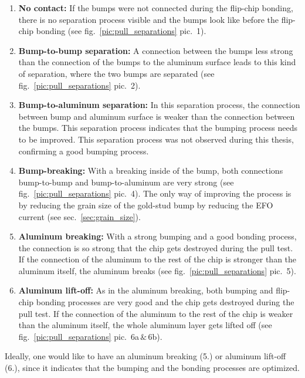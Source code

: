 \begin{enumerate}
\item \textbf{No contact:} If the bumps were not connected during the flip-chip bonding, there is no separation process visible and the bumps look like before the flip-chip bonding (see fig.~\ref{pic:pull_separations} pic.~1).
\item \textbf{Bump-to-bump separation:} A connection between the bumps less strong than the connection of the bumps to the aluminum surface leads to this kind of separation, where the two bumps are separated (see fig.~\ref{pic:pull_separations} pic.~2).
\item \textbf{Bump-to-aluminum separation:} In this separation process, the connection between bump and aluminum surface is weaker than the connection between the bumps. This separation process indicates that the bumping process needs to be improved. This separation process was not observed during this thesis, confirming a good bumping process. 
\item \textbf{Bump-breaking:} With a breaking inside of the bump, both connections bump-to-bump and bump-to-aluminum are very strong (see fig.~\ref{pic:pull_separations} pic.~4). The only way of improving the process is by reducing the grain size of the gold-stud bump by reducing the EFO current (see sec.~\ref{sec:grain_size}).
\item \textbf{Aluminum breaking:} With a strong bumping and a good bonding process, the connection is so strong that the chip gets destroyed during the pull test. If the connection of the aluminum to the rest of the chip is stronger than the aluminum itself, the aluminum breaks (see fig.~\ref{pic:pull_separations} pic.~5).
\item \textbf{Aluminum lift-off:} As in the aluminum breaking, both bumping and flip-chip bonding processes are very good and the chip gets destroyed during the pull test. If the connection of the aluminum to the rest of the chip is weaker than the aluminum itself, the whole aluminum layer gets lifted off (see fig.~\ref{pic:pull_separations} pic.~6a$\,\&\,$6b).
\end{enumerate}
Ideally, one would like to have an aluminum breaking (5.) or aluminum lift-off (6.), since it indicates that the bumping and the bonding processes are optimized.



